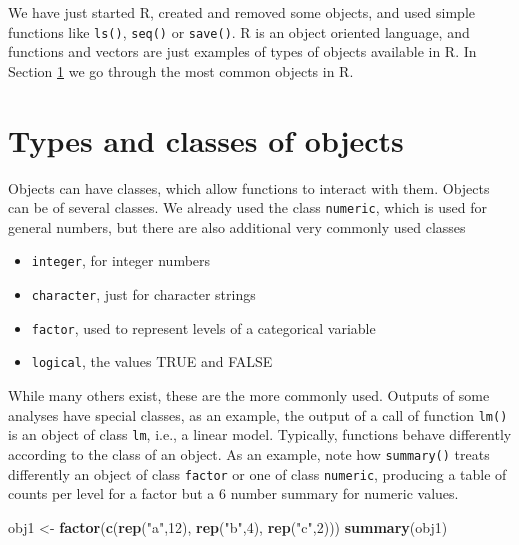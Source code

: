 \documentclass[]{book}
\newenvironment{Shaded}{\begin{snugshade}}{\end{snugshade}}
\newcommand{\KeywordTok}[1]{\textcolor[rgb]{0.13,0.29,0.53}{\textbf{#1}}}
\newcommand{\DecValTok}[1]{\textcolor[rgb]{0.00,0.00,0.81}{#1}}
\newcommand{\StringTok}[1]{\textcolor[rgb]{0.31,0.60,0.02}{#1}}
\newcommand{\NormalTok}[1]{#1}
\providecommand{\tightlist}{%
  \setlength{\itemsep}{0pt}\setlength{\parskip}{0pt}}
\theoremstyle{definition}
\theoremstyle{definition}
\theoremstyle{remark}
\begin{document}
We have just started R, created and removed some objects, and used
simple functions like \texttt{ls()}, \texttt{seq()} or \texttt{save()}.
R is an object oriented language, and functions and vectors are just
examples of types of objects available in R. In Section
\ref{Types-classes} we go through the most common objects in R.

\section{Types and classes of objects}\label{Types-classes}

Objects can have classes, which allow functions to interact with them.
Objects can be of several classes. We already used the class
\texttt{numeric}, which is used for general numbers, but there are also
additional very commonly used classes

\begin{itemize}
\tightlist
\item
  \texttt{integer}, for integer numbers
\item
  \texttt{character}, just for character strings
\item
  \texttt{factor}, used to represent levels of a categorical variable
\item
  \texttt{logical}, the values TRUE and FALSE
\end{itemize}

While many others exist, these are the more commonly used. Outputs of
some analyses have special classes, as an example, the output of a call
of function \texttt{lm()} is an object of class \texttt{lm}, i.e., a
linear model. Typically, functions behave differently according to the
class of an object. As an example, note how \texttt{summary()} treats
differently an object of class \texttt{factor} or one of class
\texttt{numeric}, producing a table of counts per level for a factor but
a 6 number summary for numeric values.

\begin{Shaded}
\begin{Highlighting}[]
\NormalTok{obj1 <-}\StringTok{ }\KeywordTok{factor}\NormalTok{(}\KeywordTok{c}\NormalTok{(}\KeywordTok{rep}\NormalTok{(}\StringTok{"a"}\NormalTok{,}\DecValTok{12}\NormalTok{), }\KeywordTok{rep}\NormalTok{(}\StringTok{"b"}\NormalTok{,}\DecValTok{4}\NormalTok{), }\KeywordTok{rep}\NormalTok{(}\StringTok{"c"}\NormalTok{,}\DecValTok{2}\NormalTok{)))}
\KeywordTok{summary}\NormalTok{(obj1)}
\end{Highlighting}
\end{Shaded}
\end{document}
